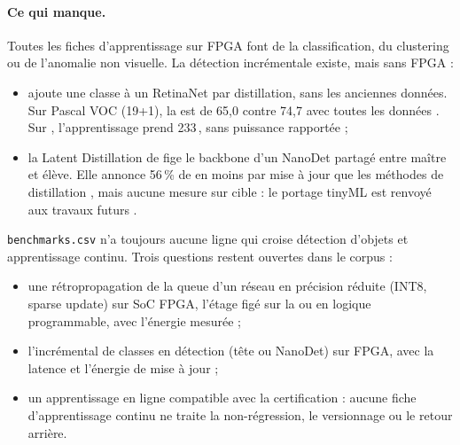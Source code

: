 \paragraph{Ce qui manque.} Toutes les fiches d'apprentissage sur FPGA font de la
classification, du clustering ou de l'anomalie non visuelle. La détection incrémentale
existe, mais sans FPGA :
\begin{itemize}
  \item {} \citep{arxiv-1904.00781-rilod-near-real-time-incremental}\pp{} ajoute une
    classe à un RetinaNet par distillation, sans les anciennes données. Sur Pascal VOC
    (19+1), la  est de 65,0 contre 74,7 avec toutes les données .
    Sur , l'apprentissage prend 233\,, sans puissance rapportée  ;
  \item la Latent Distillation de \citet{arxiv-2409.01872-latent-distillation-continual-object-detection}\pp{}
    fige le backbone d'un NanoDet partagé entre maître et élève. Elle annonce 56\,\% de 
    en moins par mise à jour que les méthodes de distillation , mais aucune mesure
    sur cible : le portage tinyML est renvoyé aux travaux futurs .
\end{itemize}
\texttt{benchmarks.csv} n'a toujours aucune ligne qui croise détection d'objets et
apprentissage continu. Trois questions restent ouvertes dans le corpus :
\begin{itemize}
  \item une rétropropagation de la queue d'un réseau en précision réduite (INT8, sparse
    update) sur SoC FPGA, l'étage figé sur la  ou en logique programmable, avec l'énergie
    mesurée ;
  \item l'incrémental de classes en détection (tête  ou NanoDet) sur FPGA, avec la
    latence et l'énergie de mise à jour ;
  \item un apprentissage en ligne compatible avec la certification : aucune fiche
    d'apprentissage continu ne traite la non-régression, le versionnage ou le retour arrière.
\end{itemize}
